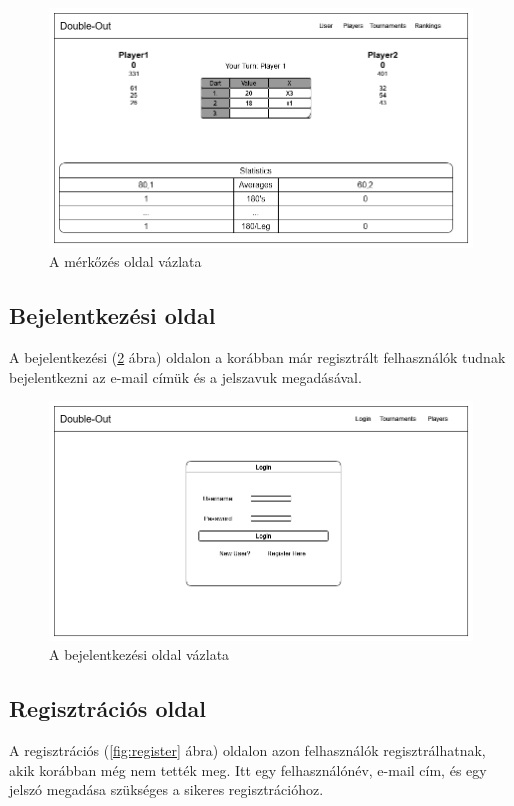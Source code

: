 \begin{figure}[h]
\centering
\includegraphics[scale=0.5]{images/MatchPage.png}
\caption{A mérkőzés oldal vázlata}
\label{fig:match}
\end{figure}

\subsection{Bejelentkezési oldal}
A bejelentkezési (\ref{fig:login} ábra) oldalon a korábban már regisztrált felhasználók tudnak bejelentkezni az e-mail címük és a jelszavuk megadásával.

\begin{figure}[h]
\centering
\includegraphics[scale=0.5]{images/Login.png}
\caption{A bejelentkezési oldal vázlata}
\label{fig:login}
\end{figure}

\subsection{Regisztrációs oldal}
A regisztrációs (\ref{fig:register} ábra) oldalon azon felhasználók regisztrálhatnak, akik korábban még nem tették meg. Itt egy felhasználónév, e-mail cím, és egy jelszó megadása szükséges a sikeres regisztrációhoz.

